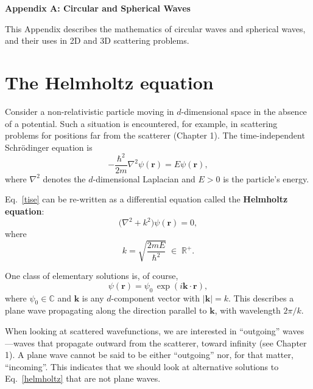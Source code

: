\documentclass[pra,12pt]{revtex4-2}
\begin{document}
\begin{center}
{\large \textbf{Appendix A: Circular and Spherical Waves}}
\end{center}

This Appendix describes the mathematics of circular waves and
spherical waves, and their uses in 2D and 3D scattering problems.

\section{The Helmholtz equation}


Consider a non-relativistic particle moving in $d$-dimensional space
in the absence of a potential.  Such a situation is encountered, for
example, in scattering problems for positions far from the scatterer
(Chapter 1).  The time-independent Schr\"odinger equation is
\begin{equation}
  -\frac{\hbar^2}{2m}\nabla^2 \psi(\mathbf{r}) = E \psi(\mathbf{r}),
  \label{tise}
\end{equation}
where $\nabla^2$ denotes the $d$-dimensional Laplacian and $E > 0$ is
the particle's energy.

Eq.~\eqref{tise} can be re-written as a differential equation called
the \textbf{Helmholtz equation}:
\begin{equation}
  \Big(\nabla^2 + k^2\Big) \psi(\mathbf{r}) = 0,
  \label{helmholtz}
\end{equation}
where
\begin{equation}
  k = \sqrt{\frac{2mE}{\hbar^2}} \;\in\; \mathbb{R}^+.
  \label{kparm}
\end{equation}

One class of elementary solutions is, of course,
\begin{equation}
  \psi(\mathbf{r}) = \psi_0 \, \exp\left(i\mathbf{k}\cdot\mathbf{r}\right),
  \label{planewaves}
\end{equation}
where $\psi_0 \in \mathbb{C}$ and $\mathbf{k}$ is any $d$-component
vector with $|\mathbf{k}| = k$.  This describes a plane wave
propagating along the direction parallel to $\mathbf{k}$, with
wavelength $2\pi/k$.

When looking at scattered wavefunctions, we are interested in
``outgoing'' waves---waves that propagate outward from the scatterer,
toward infinity (see Chapter 1).  A plane wave cannot be said to be
either ``outgoing'' nor, for that matter, ``incoming''.  This
indicates that we should look at alternative solutions to
Eq.~\eqref{helmholtz} that are not plane waves.
\end{document}
